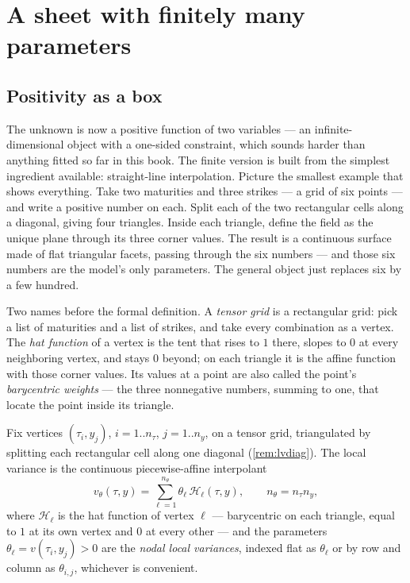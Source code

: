 \section{A sheet with finitely many parameters}
\label{sec:lvsheet}

\subsection{Positivity as a box}

The unknown is now a positive function of two variables --- an
infinite-dimensional object with a one-sided constraint, which sounds
harder than anything fitted so far in this book.  The finite version
is built from the simplest ingredient available: straight-line
interpolation.  Picture the smallest example that shows everything.
Take two maturities and three strikes --- a grid of six points --- and
write a positive number on each.  Split each of the two rectangular
cells along a diagonal, giving four triangles.  Inside each triangle,
define the field as the unique plane through its three corner values.
The result is a continuous surface made of flat triangular facets,
passing through the six numbers --- and those six numbers are the
model's only parameters.  The general object just replaces six by a
few hundred.

Two names before the formal definition.  A \emph{tensor grid} is a
rectangular grid: pick a list of maturities and a list of strikes, and
take every combination as a vertex.  The \emph{hat function} of a
vertex is the tent that rises to $1$ there, slopes to $0$ at every
neighboring vertex, and stays $0$ beyond; on each triangle it is the
affine function with those corner values.  Its values at a point are
also called the point's \emph{barycentric weights} --- the three
nonnegative numbers, summing to one, that locate the point inside its
triangle.

\begin{definition}
\label{def:lvsheet}
Fix vertices $(\tau_i,y_j)$, $i=1..n_\tau$, $j=1..n_y$, on a tensor grid,
triangulated by splitting each rectangular cell along one diagonal
(\cref{rem:lvdiag}).  The local variance is the continuous
piecewise-affine interpolant
\begin{equation}
v_\theta(\tau,y)=\sum_{\ell=1}^{n_\theta}\theta_\ell\,
\mathcal H_\ell(\tau,y),\qquad n_\theta=n_\tau n_y,
\label{eq:lvp1}
\end{equation}
where $\mathcal H_\ell$ is the hat function of vertex $\ell$ ---
barycentric on each triangle, equal to $1$ at its own vertex and $0$ at
every other --- and the parameters $\theta_\ell=v(\tau_i,y_j)>0$ are the
\emph{nodal local variances}, indexed flat as $\theta_\ell$ or by row and
column as $\theta_{i,j}$, whichever is convenient.
\end{definition}

